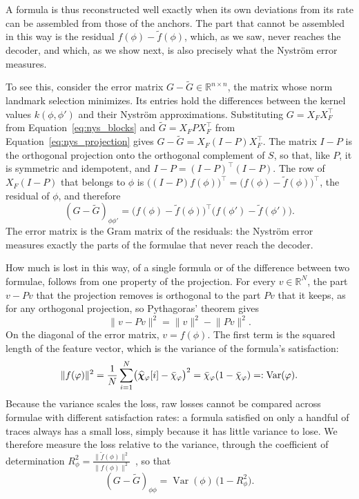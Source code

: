 \documentclass[titlepage,a4paper,11pt]{report}
\begin{document}
    A formula is thus reconstructed well exactly when its own deviations from its rate can be assembled from those of the anchors. The part that cannot be assembled in this way is the residual $f(\phi)-\tilde f(\phi)$, which, as we saw, never reaches the decoder, and which, as we show next, is also precisely what the Nyström error measures.
    
    To see this, consider the error matrix $G-\tilde G\in\mathbb R^{n\times n}$, the matrix whose norm landmark selection minimizes. Its entries hold the differences between the kernel values $k(\phi,\phi')$ and their Nyström approximations. Substituting $G=X_FX_F^\top$ from Equation~\eqref{eq:nys_blocks} and $\tilde G=X_FPX_F^\top$ from Equation~\eqref{eq:nys_projection} gives $G-\tilde G=X_F(I-P)X_F^\top$. The matrix $I-P$ is the orthogonal projection onto the orthogonal complement of $S$, so that, like $P$, it is symmetric and idempotent, and $I-P=(I-P)^\top(I-P)$. The row of $X_F(I-P)$ that belongs to $\phi$ is $\bigl((I-P)f(\phi)\bigr)^\top=\bigl(f(\phi)-\tilde f(\phi)\bigr)^\top$, the residual of $\phi$, and therefore
    \begin{equation}\label{eq:nys_error_residuals}
        (G-\tilde G)_{\phi\phi'} = \bigl(f(\phi)-\tilde f(\phi)\bigr)^\top \bigl(f(\phi')-\tilde f(\phi')\bigr).
    \end{equation}
    The error matrix is the Gram matrix of the residuals: the Nyström error measures exactly the parts of the formulae that never reach the decoder.

    How much is lost in this way, of a single formula or of the difference between two formulae, follows from one property of the projection. For every $v\in\mathbb R^N$, the part $v-Pv$ that the projection removes is orthogonal to the part $Pv$ that it keeps, as for any orthogonal projection, so Pythagoras' theorem gives
    \begin{equation}\label{eq:projection_loss}
        \lVert v-Pv\rVert^2=\lVert v\rVert^2-\lVert Pv\rVert^2 .
    \end{equation}
    On the diagonal of the error matrix, $v=f(\phi)$. The first term is the squared length of the feature vector, which is the variance of the formula's satisfaction:
    \begin{equation}\label{eq:norm_is_variance}
        \lVert f(\varphi)\rVert^2
        =\frac1N\sum_{i=1}^{N}\bigl(\bm{\widehat\chi}_\varphi[i]-\bar\chi_\varphi\bigr)^2
        =\bar\chi_\varphi(1-\bar\chi_\varphi)
        =:\operatorname{Var}(\varphi).
    \end{equation}
    Because the variance scales the loss, raw losses cannot be compared across formulae with different satisfaction rates: a formula satisfied on only a handful of traces always has a small loss, simply because it has little variance to lose. We therefore measure the loss relative to the variance, through the coefficient of determination $R^2_\phi=\frac{\lVert\tilde f(\phi)\rVert^2}{\lVert f(\phi)\rVert^2}$~\citep{anderson_introduction_2003}, so that
    \begin{equation}\label{eq:formula_error}
        (G-\tilde G)_{\phi\phi}=\operatorname{Var}(\phi)\,\bigl(1-R^2_\phi\bigr).
    \end{equation}
    
\end{document}

